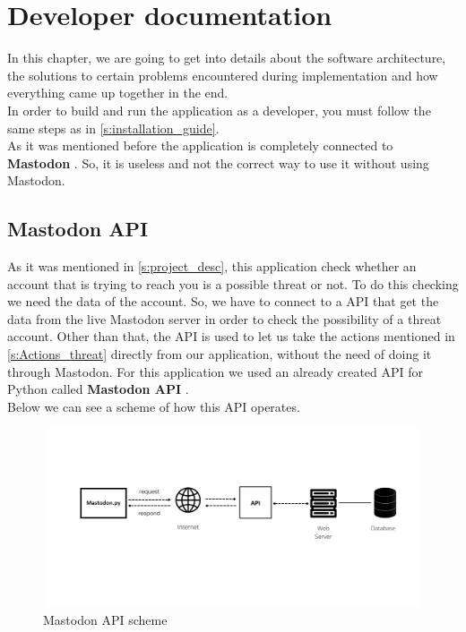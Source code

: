 \chapter{Developer documentation}
\label{ch:impl}

In this chapter, we are going to get into details about the software architecture,
the solutions to certain problems encountered during implementation and how everything came up together in the end.
\\[5pt]
In order to build and run the application as a developer, you must follow the same steps as in \ref{s:installation_guide}.
\\[5pt]
As it was mentioned before the application is completely connected to \textbf{Mastodon} \cite{test}. So, it is useless and
not the correct way to use it without using Mastodon.




\section{Mastodon API}\label{s:api}
As it was mentioned in \ref{s:project_desc}, this application check whether an account
that is trying to reach you is a possible threat or not. To do this checking we need the data
of the account. So, we have to connect to a API that get the data from
the live Mastodon server in order to check the possibility of a threat account.
Other than that, the API is used to let us take the actions mentioned in \ref{s:Actions_threat}
directly from our application, without the need of doing it through Mastodon.
For this application we used an already created API for Python called
\textbf{Mastodon API}  \cite{apimast}.
\\[5pt]
Below we can see a scheme of how this API operates.
\\[5pt]
\begin{figure}[H]
	\centering
	\includegraphics[width=1.0\textwidth,height=200px]{images/MastodonApi.png}
	\caption{Mastodon API scheme}
	\label{fig:mast_api}
\end{figure}
